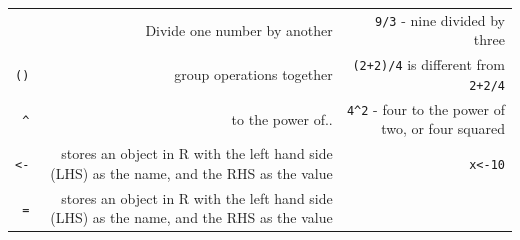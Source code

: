 \documentclass[12pt,]{krantz}
\begin{document}
\begin{longtable}[]{@{}rrr@{}}
\begin{minipage}[t]{0.30\columnwidth}
\end{minipage} & \begin{minipage}[t]{0.30\columnwidth}\raggedleft
Divide one number by another\strut
\end{minipage} & \begin{minipage}[t]{0.30\columnwidth}\raggedleft
\texttt{9/3} - nine divided by three\strut
\end{minipage}\tabularnewline
\begin{minipage}[t]{0.30\columnwidth}\raggedleft
\texttt{()}\strut
\end{minipage} & \begin{minipage}[t]{0.30\columnwidth}\raggedleft
group operations together\strut
\end{minipage} & \begin{minipage}[t]{0.30\columnwidth}\raggedleft
\texttt{(2+2)/4} is different from \texttt{2+2/4}\strut
\end{minipage}\tabularnewline
\begin{minipage}[t]{0.30\columnwidth}\raggedleft
\texttt{\^{}}\strut
\end{minipage} & \begin{minipage}[t]{0.30\columnwidth}\raggedleft
to the power of..\strut
\end{minipage} & \begin{minipage}[t]{0.30\columnwidth}\raggedleft
\texttt{4\^{}2} - four to the power of two, or four squared\strut
\end{minipage}\tabularnewline
\begin{minipage}[t]{0.30\columnwidth}\raggedleft
\texttt{\textless{}-}\strut
\end{minipage} & \begin{minipage}[t]{0.30\columnwidth}\raggedleft
stores an object in R with the left hand side (LHS) as the name, and the RHS as the value\strut
\end{minipage} & \begin{minipage}[t]{0.30\columnwidth}\raggedleft
\texttt{x\textless{}-10}\strut
\end{minipage}\tabularnewline
\begin{minipage}[t]{0.30\columnwidth}\raggedleft
\texttt{=}\strut
\end{minipage} & \begin{minipage}[t]{0.30\columnwidth}\raggedleft
stores an object in R with the left hand side (LHS) as the name, and the RHS as the value\strut
\end{minipage} & \begin{minipage}[t]{0.30\columnwidth}\raggedleft

\end{minipage}
\end{longtable}
\end{document}
